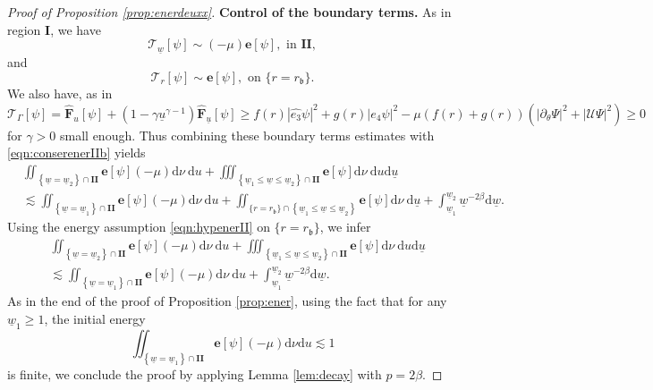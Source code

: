 \documentclass[reqno]{amsart}
\numberwithin{equation}{section}
\newcommand{\modnab}{|\partial_\theta\Psi|^2+|\mathcal{U}\Psi|^2}
\newcommand{\wbar}{\underline{w}}
\newcommand{\ubar}{{\underline{u}}}
\newcommand{\dee}{\mathrm{d}}
\newcommand{\ener}{\mathbf{e}}
\newcommand{\ethat}{\widehat{e_3}}
\newcommand{\un}{\mathbf{I}}
\newcommand{\deux}{\mathbf{II}}
\newcommand{\rb}{r_\mathfrak{b}}
\theoremstyle{plain}
\theoremstyle{definition}
\theoremstyle{remark}
\numberwithin{equation}{section}
\begin{document}
\begin{proof}[Proof of Proposition \ref{prop:enerdeuxx}]
\noindent\textbf{Control of the boundary terms.} As in region $\un$, we have
$$\mathcal{T}_{\wbar}[\psi]\sim(-\mu)\ener[\psi], \text{   in   }\deux,$$
and
$$\mathcal{T}_{r}[\psi]\sim \ener[\psi],\text{   on   }\{r=\rb\}.$$
We also have, as in \cite{scalarMZ}
$$\mathcal{T}_\Gamma[\psi]=\widehat{\mathbf{F}}_u[\psi]+(1-\gamma\ubar^{\gamma-1})\widehat{\mathbf{F}}_{{\ubar}}[\psi]\geq f(r)|\ethat\psi|^2+g(r)|e_4\psi|^2-\mu(f(r)+g(r))(\modnab)\geq 0$$
for $\gamma>0$ small enough. Thus combining these boundary terms estimates with \eqref{eqn:conserenerIIb} yields
\begin{align}
 &\iint_{\left\{\wbar=\wbar_2\right\} \cap \mathbf{II}} \ener[\psi]  (-\mu)\dee\nu\mathrm{~d} u+\iiint_{\left\{\wbar_1 \leq \wbar\leq \wbar_2\right\} \cap \mathbf{II}} \ener[\psi] \dee\nu\:\dee u\dee\ubar\nonumber \\
 &\lesssim \iint_{\left\{\wbar=\wbar_1\right\} \cap \mathbf{II}} \ener[\psi] (-\mu)\dee\nu \mathrm{~d} u+\iint_{\{r=r_{\mathfrak{b}}\}  \cap\left\{\wbar_1 \leq \wbar \leq \wbar_2\right\}} \ener[\psi] \dee\nu \mathrm{~d} \underline{u}+\int_{\wbar_1}^{\wbar_2}\wbar^{-2\beta}\dee\wbar.\label{eqn:avantlemII}
 \end{align}
 Using the energy assumption \eqref{eqn:hypenerII} on $\{r=\rb\}$, we infer 
\begin{align}
 &\iint_{\left\{\wbar=\wbar_2\right\} \cap \mathbf{II}} \ener[\psi]  (-\mu)\dee\nu\mathrm{~d} u+\iiint_{\left\{\wbar_1 \leq \wbar\leq \wbar_2\right\} \cap \mathbf{II}} \ener[\psi] \dee\nu\:\dee u\dee\ubar\nonumber \\
 &\lesssim \iint_{\left\{\wbar=\wbar_1\right\} \cap \mathbf{II}} \ener[\psi] (-\mu)\dee\nu \mathrm{~d} u+\int_{\wbar_1}^{\wbar_2}\wbar^{-2\beta}\dee\wbar.\label{eqn:avantlemIIprim}
 \end{align}
{As in the end of the proof of Proposition \ref{prop:ener}, using the fact that for any $\wbar_1\geq 1$, the initial energy 
$$\iint_{\left\{\underline{w}=\underline{w}_1\right\} \cap \mathbf{II}} \mathbf{e}[\psi](-\mu) \dee\nu \mathrm{d} u\lesssim 1$$
is finite, we conclude the proof by applying Lemma \ref{lem:decay} with $p=2\beta$.}
\end{proof}
\end{document}
